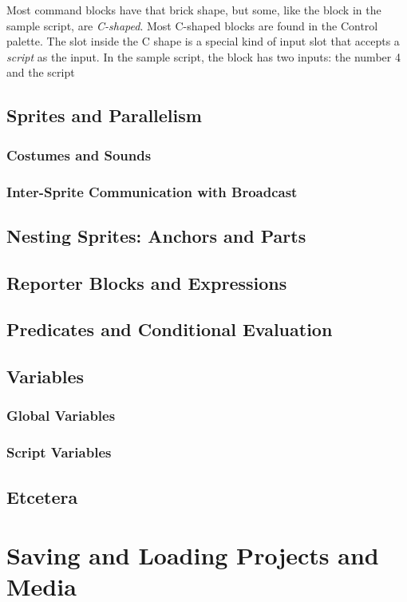 \documentclass{report}
\begin{document}
Most command blocks have that brick shape, but some, like the  block in the sample script, are \emph{C-shaped}. Most C-shaped blocks are found in the Control palette. The slot inside the C shape is a special kind of input slot that accepts a \emph{script} as the input. In the sample script, the  block has two inputs: the number 4 and the script




\section{Sprites and Parallelism}
\subsection{Costumes and Sounds}
\subsection{Inter-Sprite Communication with Broadcast}
\section{Nesting Sprites: Anchors and Parts}
\label{sec:nesting-sprites}
\section{Reporter Blocks and Expressions}
\section{Predicates and Conditional Evaluation}
\section{Variables}
\subsection{Global Variables}
\subsection{Script Variables}
\section{Etcetera}
\chapter{Saving and Loading Projects and Media}
\end{document}
